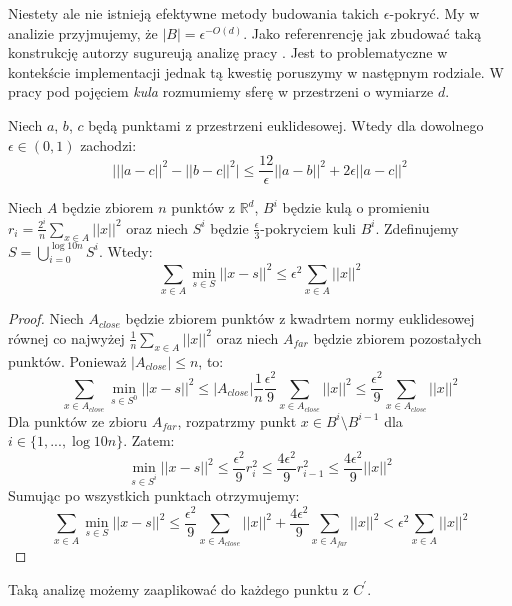 \noindent
Niestety ale nie istnieją efektywne metody budowania takich $\epsilon$-pokryć.
My w analizie przyjmujemy, że  $|B| = \epsilon^{-O(d)}$.
Jako referenrencję jak zbudować taką konstrukcję autorzy sugureują analizę pracy \cite{chazelle_2000}.
Jest to problematyczne w kontekście implementacji jednak tą kwestię poruszymy w następnym rodziale.
W pracy pod pojęciem \textit{kula} rozmumiemy sferę w przestrzeni o wymiarze $d$.
\begin{lemma}{\cite{DBLP:journals/ki/MunteanuS18}}
    Niech $a$, $b$, $c$ będą punktami z przestrzeni euklidesowej.
    Wtedy dla dowolnego $\epsilon \in (0,1)$ zachodzi:
    \begin{equation}
        \Big| ||a-c||^{2} - ||b-c||^{2} \Big| \leq \frac{12}{\epsilon} ||a-b||^2 + 2\epsilon||a-c||^2
    \end{equation}
\end{lemma}
\begin{lemma}
    Niech $A$ będzie zbiorem $n$ punktów z $\mathbb{R}^d$, $B^{i}$ będzie kulą o promieniu $r_{i} = \frac{2^{i}}{n}\sum_{x \in A} ||x||^{2}$ oraz niech $S^{i}$ będzie $\frac{\epsilon}{3}$-pokryciem kuli $B^{i}$.
    Zdefinujemy $S = \bigcup_{i=0}^{\log 10n} S^{i}$. 
    Wtedy:
    \begin{equation}
        \sum_{x\in A} \min_{s \in S} ||x - s||^{2} \leq \epsilon^{2} \sum_{x \in A} ||x||^{2}
    \end{equation}
\end{lemma}
\begin{proof}
    Niech $A_{close}$ będzie zbiorem punktów z kwadrtem normy euklidesowej równej co najwyżej $\frac{1}{n}\sum_{x \in A}||x||^{2}$ oraz niech $A_{far}$ będzie zbiorem pozostałych punktów.
    Ponieważ $|A_{close}| \leq n$, to:
    \begin{equation}
        \sum_{x\in A_{close}} \min_{s \in S^{0}} ||x - s||^{2} \leq |A_{close}|\frac{1}{n}\frac{\epsilon^{2}}{9}\sum_{x \in A_{close}}||x||^{2} \leq \frac{\epsilon^{2}}{9}\sum_{x \in A_{close}}||x||^{2}
    \end{equation}
    \noindent
    Dla punktów ze zbioru $A_{far}$, rozpatrzmy punkt $x \in B^{i} \setminus B^{i-1}$ dla $i \in \{1, ..., \log10n \}$.
    Zatem:
    \begin{equation}
       \min_{s \in S^{i}} ||x - s||^{2} \leq \frac{\epsilon^{2}}{9} r_{i}^{2} \leq \frac{4\epsilon^{2}}{9} r_{i-1}^{2} \leq \frac{4\epsilon^{2}}{9} ||x||^2
    \end{equation}
    Sumując po wszystkich punktach otrzymujemy:
    \begin{equation}
        \sum_{x\in A} \min_{s \in S} ||x - s||^{2} \leq \frac{\epsilon^{2}}{9}\sum_{x \in A_{close}}||x||^{2} + \frac{4\epsilon^{2}}{9} \sum_{x \in A_{far}}||x||^2 < \epsilon^{2} \sum_{x \in A} ||x||^{2}
    \end{equation}
\end{proof}
\noindent
Taką analizę możemy zaaplikować do każdego punktu z $C^{'}$.

